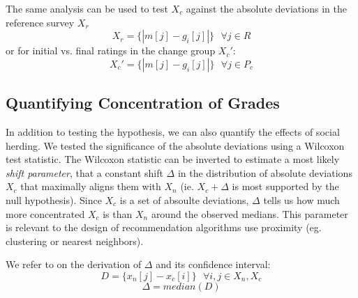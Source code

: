The same analysis can be used to test $X_c$ against the absolute deviations in the reference survey $X_r$
\begin{equation}
X_r = \{|m[j] - g_i[j]|\}\text{ }\forall j \in R
\end{equation} 
or for initial vs. final ratings in the change group $X_c'$:
\begin{equation}
X_c' = \{|m[j] - g_i[j]|\}\text{ }\forall j \in P_c
\end{equation}

\subsection{Quantifying Concentration of Grades}
In addition to testing the hypothesis, we can also quantify the effects of social herding. 
We tested the significance of the absolute deviations using a Wilcoxon test statistic.
The Wilcoxon statistic can be inverted to estimate a most likely \emph{shift parameter}, that a constant shift $\Delta$ in the distribution of absolute deviations $X_c$ that maximally aligns them with $X_n$ (ie. $X_c + \Delta$ is most supported by the null hypothesis). 
Since $X_c$ is a set of absoulte deviations, $\Delta$ tells us how much more concentrated $X_c$ is than $X_n$ around the observed medians.
This parameter is relevant to the design of recommendation algorithms use proximity (eg. clustering or nearest neighbors).

We refer to \cite{lehmann2006nonparametrics} on the derivation of $\Delta$ and its confidence interval:
\begin{equation}
D = \{x_n[j] - x_c[i]\} \text{ } \forall i,j \in X_n, X_c
\end{equation}
\begin{equation}
\Delta = median(D)
\end{equation}





